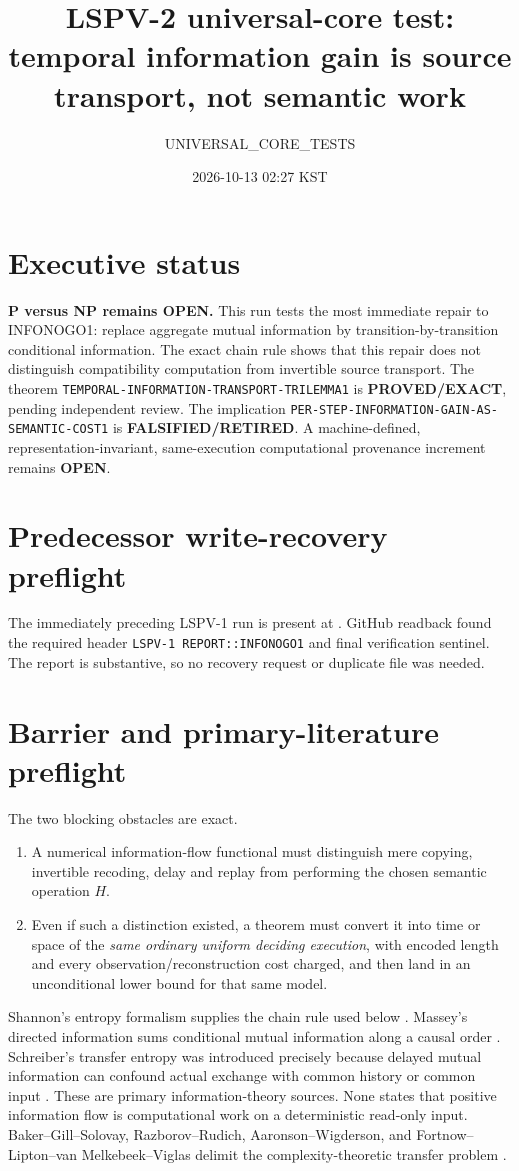 \documentclass[11pt]{article}
\title{LSPV-2 universal-core test: temporal information gain is source transport, not semantic work}
\author{UNIVERSAL\_CORE\_TESTS}
\date{2026-10-13 02:27 KST}
\newcommand{\EXACT}{\textbf{PROVED/EXACT}}
\newcommand{\OPEN}{\textbf{OPEN}}
\newcommand{\RETIRED}{\textbf{FALSIFIED/RETIRED}}
\newcommand{\claim}[1]{\texttt{#1}}
\begin{document}
\maketitle

\section*{Executive status}
\textbf{P versus NP remains \OPEN.}  This run tests the most immediate repair
to INFONOGO1: replace aggregate mutual information by transition-by-transition
conditional information.  The exact chain rule shows that this repair does
not distinguish compatibility computation from invertible source transport.
The theorem \claim{TEMPORAL-INFORMATION-TRANSPORT-TRILEMMA1} is \EXACT,
pending independent review.  The implication
\claim{PER-STEP-INFORMATION-GAIN-AS-SEMANTIC-COST1} is \RETIRED.  A
machine-defined, representation-invariant, same-execution computational
provenance increment remains \OPEN.

\section{Predecessor write-recovery preflight}
The immediately preceding LSPV-1 run is present at
.  GitHub
readback found the required header
\texttt{LSPV-1 REPORT::INFONOGO1} and final verification sentinel.  The report
is substantive, so no recovery request or duplicate file was needed.

\section{Barrier and primary-literature preflight}
The two blocking obstacles are exact.
\begin{enumerate}[leftmargin=*]
\item A numerical information-flow functional must distinguish mere copying,
invertible recoding, delay and replay from performing the chosen semantic
operation $H$.
\item Even if such a distinction existed, a theorem must convert it into time
or space of the \emph{same ordinary uniform deciding execution}, with encoded
length and every observation/reconstruction cost charged, and then land in an
unconditional lower bound for that same model.
\end{enumerate}
Shannon's entropy formalism supplies the chain rule used below
\cite{shannon1948}.  Massey's directed information sums conditional mutual
information along a causal order \cite{massey1990}.  Schreiber's transfer
entropy was introduced precisely because delayed mutual information can
confound actual exchange with common history or common input
\cite{schreiber2000}.  These are primary information-theory sources.  None
states that positive information flow is computational work on a deterministic
read-only input.  Baker--Gill--Solovay, Razborov--Rudich,
Aaronson--Wigderson, and Fortnow--Lipton--van Melkebeek--Viglas delimit the
complexity-theoretic transfer problem \cite{bgs1975,rr1997,aw2009,flmv2005}.
\end{document}
